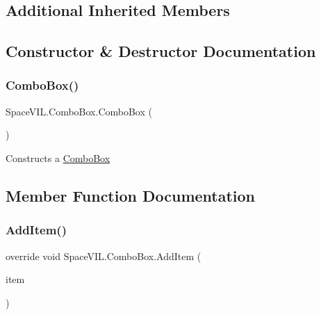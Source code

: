 \subsection*{Additional Inherited Members}


\subsection{Constructor \& Destructor Documentation}
\mbox{\label{class_space_v_i_l_1_1_combo_box_a5d981f81824ff870fa91043c93394f68}} 
\subsubsection{\texorpdfstring{Combo\+Box()}{ComboBox()}}
{\footnotesize\ttfamily Space\+V\+I\+L.\+Combo\+Box.\+Combo\+Box (\begin{DoxyParamCaption}{ }\end{DoxyParamCaption})}



Constructs a \mbox{\hyperlink{class_space_v_i_l_1_1_combo_box}{Combo\+Box}} 



\subsection{Member Function Documentation}
\mbox{\label{class_space_v_i_l_1_1_combo_box_a05b737bc6384aa858fe63ffe5cc03afd}} 
\subsubsection{\texorpdfstring{Add\+Item()}{AddItem()}}
{\footnotesize\ttfamily override void Space\+V\+I\+L.\+Combo\+Box.\+Add\+Item (\begin{DoxyParamCaption}\item[{\mbox{\hyperlink{interface_space_v_i_l_1_1_core_1_1_i_base_item}{I\+Base\+Item}}}]{item }\end{DoxyParamCaption})\hspace{0.3cm}{\ttfamily [virtual]}}



